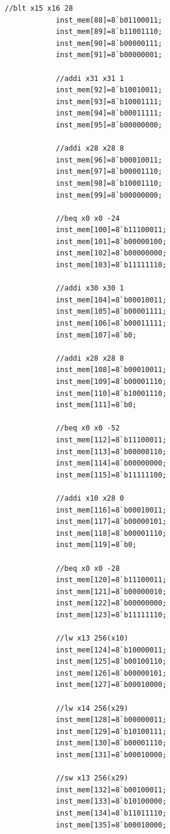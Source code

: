 \documentclass{article}
\begin{document}
\begin{lstlisting}[caption={Changes to Instruction Memory}, captionpos=b, language=RISC-V]
            //blt x15 x16 28
            inst_mem[88]=8`b01100011;
            inst_mem[89]=8`b11001110;
            inst_mem[90]=8`b00000111;
            inst_mem[91]=8`b00000001;
            
            //addi x31 x31 1
            inst_mem[92]=8`b10010011;
            inst_mem[93]=8`b10001111;
            inst_mem[94]=8`b00011111;
            inst_mem[95]=8`b00000000;
            
            //addi x28 x28 8
            inst_mem[96]=8`b00010011;
            inst_mem[97]=8`b00001110;
            inst_mem[98]=8`b10001110;
            inst_mem[99]=8`b00000000;
        
            //beq x0 x0 -24
            inst_mem[100]=8`b11100011;
            inst_mem[101]=8`b00000100;
            inst_mem[102]=8`b00000000;
            inst_mem[103]=8`b11111110;
            
            //addi x30 x30 1
            inst_mem[104]=8`b00010011;
            inst_mem[105]=8`b00001111;
            inst_mem[106]=8`b00011111;
            inst_mem[107]=8`b0;
            
            //addi x28 x28 8
            inst_mem[108]=8`b00010011;
            inst_mem[109]=8`b00001110;
            inst_mem[110]=8`b10001110;
            inst_mem[111]=8`b0;
            
            //beq x0 x0 -52
            inst_mem[112]=8`b11100011;
            inst_mem[113]=8`b00000110;
            inst_mem[114]=8`b00000000;
            inst_mem[115]=8`b11111100;
            
            //addi x10 x28 0
            inst_mem[116]=8`b00010011;
            inst_mem[117]=8`b00000101;
            inst_mem[118]=8`b00001110;
            inst_mem[119]=8`b0;
            
            //beq x0 x0 -28
            inst_mem[120]=8`b11100011;
            inst_mem[121]=8`b00000010;
            inst_mem[122]=8`b00000000;
            inst_mem[123]=8`b11111110;
            
            //lw x13 256(x10)
            inst_mem[124]=8`b10000011;
            inst_mem[125]=8`b00100110;
            inst_mem[126]=8`b00000101;
            inst_mem[127]=8`b00010000;
            
            //lw x14 256(x29)
            inst_mem[128]=8`b00000011;
            inst_mem[129]=8`b10100111;
            inst_mem[130]=8`b00001110;
            inst_mem[131]=8`b00010000;
            
            //sw x13 256(x29)
            inst_mem[132]=8`b00100011;
            inst_mem[133]=8`b10100000;
            inst_mem[134]=8`b11011110;
            inst_mem[135]=8`b00010000;
            

\end{lstlisting}
\end{document}
